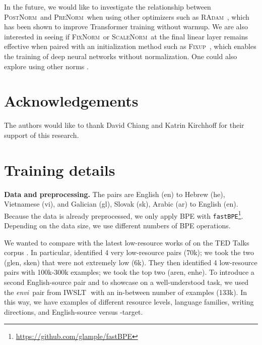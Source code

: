 \documentclass[11pt,a4paper]{article}
\newcommand{\arTOen}{ar\textrightarrow en}
\newcommand{\enTOhe}{en\textrightarrow he}
\newcommand{\enTOvi}{\textit{en\textrightarrow vi}}
\newcommand{\glTOen}{gl\textrightarrow en}
\newcommand{\skTOen}{sk\textrightarrow en}
\newcommand{\SCNorm}{\textsc{ScaleNorm}}
\newcommand{\PreNorm}{\textsc{PreNorm}}
\newcommand{\PostNorm}{\textsc{PostNorm}}
\newcommand{\fixnorm}{\textsc{FixNorm}}
\newcommand{\radam}{\textsc{RAdam}}
\newcommand{\fixup}{\textsc{Fixup}}
\newcommand{\IWSLT}{IWSLT\,\textquotesingle 15}
\renewcommand{\paragraph}[1]{\par\medskip\noindent\textbf{#1}}
\begin{document}
In the future, we would like to investigate the relationship between \PostNorm\ and \PreNorm\ when using other optimizers such as \radam\ \cite{radam}, which has been shown to improve Transformer training without warmup. We are also interested in seeing if \fixnorm\ or \SCNorm\ at the final linear layer remains effective when paired with an initialization method such as \fixup\ \cite{fixupinit}, which enables the training of deep neural networks without normalization. One could also explore using other  norms \cite{Santurkar2018}. 
\section*{Acknowledgements}
The authors would like to thank David Chiang and Katrin Kirchhoff for their support of this research.
 



\appendix

\section{Training details}
\label{appendix:setup}

\paragraph{Data and preprocessing.} The pairs are English (en) to {Hebrew (he), Vietnamese (vi)}, and {Galician (gl), Slovak (sk), Arabic (ar)} to English (en). Because the data is already preprocessed, we only apply BPE \cite{Sennrich2016} with \texttt{fastBPE}\footnote{\url{https://github.com/glample/fastBPE}}. Depending on the data size, we use different numbers of BPE operations.

We wanted to compare with the latest low-resource works of \cite{Neubig2019, Aharoni2019} on the TED Talks corpus \cite{Qi2018-word-embeddings-nmt}. In particular, \citet{Aharoni2019} identified 4 very low-resource pairs (70k); we took the two (\glTOen, \skTOen) that were not extremely low (6k). They then identified 4 low-resource pairs with 100k-300k examples; we took the top two (\arTOen, \enTOhe). To introduce a second English-source pair and to showcase on a well-understood task, we used the \enTOvi\ pair from \IWSLT\ with an in-between number of examples (133k). In this way, we have examples of different resource levels, language families, writing directions, and English-source versus -target.
\end{document}
